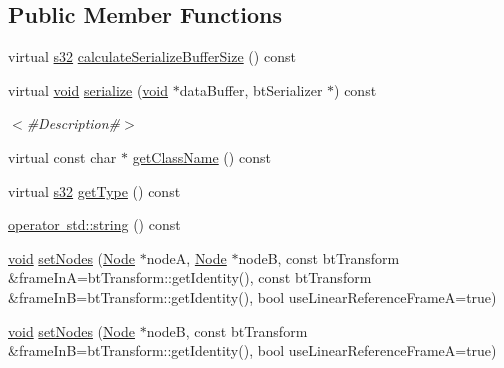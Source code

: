 \subsection*{Public Member Functions}
\begin{DoxyCompactItemize}
\item 
virtual \mbox{\hyperlink{_util_8h_aa62c75d314a0d1f37f79c4b73b2292e2}{s32}} \mbox{\hyperlink{classnjli_1_1_physics_constraint_slider_ab6ed2eeb48050c378f525ee7f80a4bd4}{calculate\+Serialize\+Buffer\+Size}} () const
\item 
virtual \mbox{\hyperlink{_thread_8h_af1e856da2e658414cb2456cb6f7ebc66}{void}} \mbox{\hyperlink{classnjli_1_1_physics_constraint_slider_ab29e0ae4cc45af8ac95cfe8052f1ed48}{serialize}} (\mbox{\hyperlink{_thread_8h_af1e856da2e658414cb2456cb6f7ebc66}{void}} $\ast$data\+Buffer, bt\+Serializer $\ast$) const
\begin{DoxyCompactList}\small\item\em $<$\#\+Description\#$>$ \end{DoxyCompactList}\item 
virtual const char $\ast$ \mbox{\hyperlink{classnjli_1_1_physics_constraint_slider_a6258ffd852a364064bfddb19669293c2}{get\+Class\+Name}} () const
\item 
virtual \mbox{\hyperlink{_util_8h_aa62c75d314a0d1f37f79c4b73b2292e2}{s32}} \mbox{\hyperlink{classnjli_1_1_physics_constraint_slider_a7cc1bbd160314dabb3c6764a8ea1e307}{get\+Type}} () const
\item 
\mbox{\hyperlink{classnjli_1_1_physics_constraint_slider_af9602575e8d5e0fff26b52871c653484}{operator std\+::string}} () const
\item 
\mbox{\hyperlink{_thread_8h_af1e856da2e658414cb2456cb6f7ebc66}{void}} \mbox{\hyperlink{classnjli_1_1_physics_constraint_slider_a57013fed17878085a66adbe06df33545}{set\+Nodes}} (\mbox{\hyperlink{classnjli_1_1_node}{Node}} $\ast$nodeA, \mbox{\hyperlink{classnjli_1_1_node}{Node}} $\ast$nodeB, const bt\+Transform \&frame\+InA=bt\+Transform\+::get\+Identity(), const bt\+Transform \&frame\+InB=bt\+Transform\+::get\+Identity(), bool use\+Linear\+Reference\+FrameA=true)
\item 
\mbox{\hyperlink{_thread_8h_af1e856da2e658414cb2456cb6f7ebc66}{void}} \mbox{\hyperlink{classnjli_1_1_physics_constraint_slider_a7e83353e02b081ac6b1a42ca52239455}{set\+Nodes}} (\mbox{\hyperlink{classnjli_1_1_node}{Node}} $\ast$nodeB, const bt\+Transform \&frame\+InB=bt\+Transform\+::get\+Identity(), bool use\+Linear\+Reference\+FrameA=true)
\item 

\end{DoxyCompactItemize}
